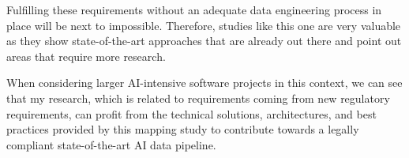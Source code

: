 \documentclass[titlepage,11pt]{article}
\begin{document}
Fulfilling these requirements without an adequate data engineering process in place will be next to impossible. Therefore, studies like this one are very valuable as they show state-of-the-art approaches that are already out there and point out areas that require more research. 

When considering larger AI-intensive software projects in this context, we can see that my research, which is related to requirements coming from new regulatory requirements, can profit from the technical solutions, architectures, and best practices provided by this mapping study to contribute towards a legally compliant state-of-the-art AI data pipeline.



\end{document}

